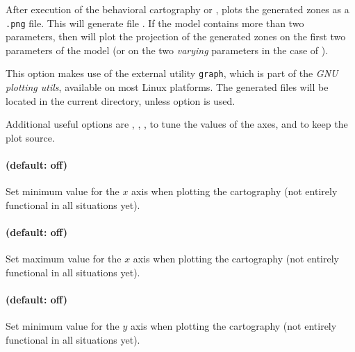 After execution of the behavioral cartography or \EFsynth{}, plots the generated zones as a \texttt{.png} file.
This will generate file .
If the model contains more than two parameters, then  will plot the projection of the generated zones on the first two parameters of the model (or on the two \emph{varying} parameters in the case of \BC{}).

This option makes use of the external utility \texttt{graph}, which is
part of the \emph{GNU plotting utils}, available on most Linux
platforms.
The generated files will be located in the current directory, unless option  is used.

Additional useful options are
,
,
,
to tune the values of the axes,
and  to keep the plot source.


\paragraph{ (default: off)}
Set minimum value for the $x$ axis when plotting the cartography (not entirely functional in all situations yet).

\paragraph{ (default: off)}
Set maximum value for the $x$ axis when plotting the cartography (not entirely functional in all situations yet).

\paragraph{ (default: off)}
Set minimum value for the $y$ axis when plotting the cartography (not entirely functional in all situations yet).

